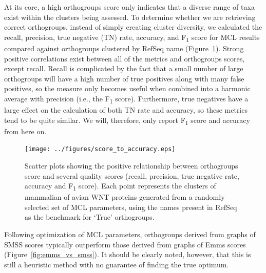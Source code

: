\documentclass[twocolumn]{bmcart}  %
\begin{document}
At its core, a high orthogroups score only indicates that a diverse range of taxa exist within the clusters being assessed.
To determine whether we are retrieving correct orthogroups, instead of simply creating cluster diversity, we calculated the recall, precision, true negative (TN) rate, accuracy, and F\textsubscript{1} score for MCL results compared against orthogroups clustered by RefSeq name (Figure~\ref{fig:score_to_accuracy}).
Strong positive correlations exist between all of the metrics and orthogroups scores, except recall.
Recall is complicated by the fact that a small number of large orthogroups will have a high number of true positives along with many false positives, so the measure only becomes useful when combined into a harmonic average with precision (i.e., the F\textsubscript{1} score).
Furthermore, true negatives have a large effect on the calculation of both TN rate and accuracy, so these metrics tend to be quite similar.
We will, therefore, only report F\textsubscript{1} score and accuracy from here on.

\begin{figure}[t]
  \begin{center}
  \texttt{[image: ../figures/score\_to\_accuracy.eps]}
\end{center}
\caption{Scatter plots showing the positive relationship between orthogroups score and several quality scores (recall, precision, true negative rate, accuracy and F\textsubscript{1} score). Each point represents the clusters of mammalian of avian WNT proteins generated from a randomly selected set of MCL parameters, using the names present in RefSeq as the benchmark for `True' orthogroups.}
\label{fig:score_to_accuracy}
\end{figure}


Following optimization of MCL parameters, orthogroups derived from graphs of SMSS scores typically outperform those derived from graphs of Emms scores (Figure~\ref{fig:emms_vs_smss}).
It should be clearly noted, however, that this is still a heuristic method with no guarantee of finding the true optimum.
\end{document}

